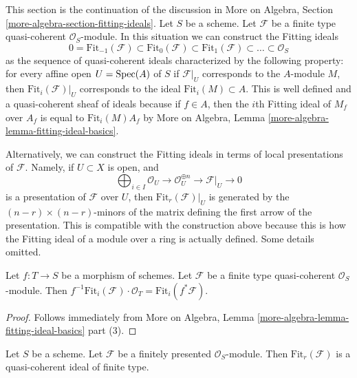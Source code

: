 \noindent
This section is the continuation of the discussion in
More on Algebra, Section \ref{more-algebra-section-fitting-ideals}.
Let $S$ be a scheme. Let $\mathcal{F}$ be a
finite type quasi-coherent $\mathcal{O}_S$-module.
In this situation we can construct the Fitting ideals
$$
0 = \text{Fit}_{-1}(\mathcal{F}) \subset \text{Fit}_0(\mathcal{F}) \subset
\text{Fit}_1(\mathcal{F}) \subset \ldots \subset \mathcal{O}_S
$$
as the sequence of quasi-coherent ideals characterized by the following
property: for every affine open $U = \mathop{\mathrm{Spec}}(A)$ of $S$ if $\mathcal{F}|_U$
corresponds to the $A$-module $M$, then $\text{Fit}_i(\mathcal{F})|_U$
corresponds to the ideal $\text{Fit}_i(M) \subset A$.
This is well defined and a quasi-coherent sheaf of ideals because
if $f \in A$, then the $i$th Fitting ideal of $M_f$ over $A_f$
is equal to $\text{Fit}_i(M) A_f$ by
More on Algebra, Lemma \ref{more-algebra-lemma-fitting-ideal-basics}.

\medskip\noindent
Alternatively, we can construct the Fitting ideals in terms of local
presentations of $\mathcal{F}$. Namely, if $U \subset X$ is open, and
$$
\bigoplus\nolimits_{i \in I} \mathcal{O}_U \to
\mathcal{O}_U^{\oplus n} \to \mathcal{F}|_U \to 0
$$
is a presentation of $\mathcal{F}$ over $U$, then
$\text{Fit}_r(\mathcal{F})|_U$ is generated by the
$(n - r) \times (n - r)$-minors
of the matrix defining the first arrow of the presentation.
This is compatible with the construction above because this
is how the Fitting ideal of a module over a ring is actually defined.
Some details omitted.

\begin{lemma}
\label{lemma-base-change-fitting-ideal}
Let $f : T \to S$ be a morphism of schemes.
Let $\mathcal{F}$ be a finite type quasi-coherent $\mathcal{O}_S$-module.
Then
$f^{-1}\text{Fit}_i(\mathcal{F}) \cdot \mathcal{O}_T =
\text{Fit}_i(f^*\mathcal{F})$.
\end{lemma}

\begin{proof}
Follows immediately from More on Algebra, Lemma
\ref{more-algebra-lemma-fitting-ideal-basics} part (3).
\end{proof}

\begin{lemma}
\label{lemma-fitting-ideal-of-finitely-presented}
Let $S$ be a scheme.
Let $\mathcal{F}$ be a finitely presented $\mathcal{O}_S$-module.
Then $\text{Fit}_r(\mathcal{F})$ is a quasi-coherent ideal of finite type.
\end{lemma}

